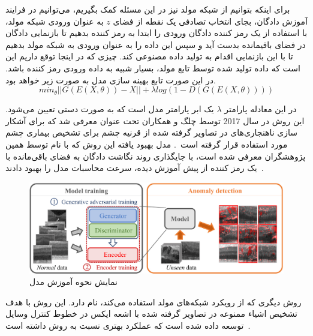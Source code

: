 \documentclass[12pt,a4paper]{report}
\theoremstyle{definition}
\theoremstyle{definition}
\begin{document}
برای اینکه بتوانیم از شبکه مولد نیز در این مسئله کمک بگیریم، می‌توانیم در فرایند آموزش دادگان، بجای انتخاب تصادفی یک نقطه از فضای $z$ به عنوان ورودی شبکه مولد، با استفاده از یک رمز کننده دادگان ورودی را ابتدا به رمز کننده بدهیم تا بازنمایی دادگان در فضای باقیمانده بدست آید و سپس این داده را به عنوان ورودی به شبکه مولد بدهیم تا با این بازنمایی اقدام به تولید داده مصنوعی کند. چیزی که در اینجا توقع داریم این است که داده تولید شده توسط تابع مولد، بسیار شبیه به داده ورودی رمز کننده باشد. در این صورت تابع بهینه سازی مدل به صورت زیر خواهد بود.
\begin{equation}
	min_\theta ||G(E(X, \theta)) - X|| + \lambda log(1-D(G(E(X, \theta))))
\end{equation}

در این معادله پارامتر $\lambda$ یک ابر پارامتر مدل است که به صورت دستی تعیین می‌شود. این روش در سال 2017 توسط چلگ و همکاران تحت عنوان  معرفی شد که برای آشکار سازی ناهنجاری‌های در تصاویر  گرفته شده از قرنیه چشم برای تشخیص بیماری چشم مورد استفاده قرار گرفته است~\cite{10.1007/978-3-319-59050-9_12}. مدل بهبود یافته این روش که با نام  توسط همین پژوهشگران معرفی شده است، با جایگذاری روند نگاشت دادگان به فضای باقی‌مانده با یک رمز کننده از پیش آموزش دیده، سرعت محاسبات مدل را بهبود دادند~\cite{SCHLEGL201930}.
\begin{figure}[!h]
	\begin{center}
		\includegraphics[width=0.7\linewidth]{./images/figures/anogan.png}
	\end{center}
	\caption{نمایش نحوه آموزش مدل ~\cite{SCHLEGL201930}}
	\label{fig:vae}
	\centering
\end{figure}

روش دیگری که از رویکرد شبکه‌های مولد استفاده می‌کند،  نام دارد. این روش با هدف تشخیص اشیاء ممنوعه در تصاویر گرفته شده با اشعه ایکس در خطوط کنترل وسایل توسعه داده شده است که عملکرد بهتری نسبت به روش داشته است~\cite{akcay2018ganomaly}.
\end{document}
